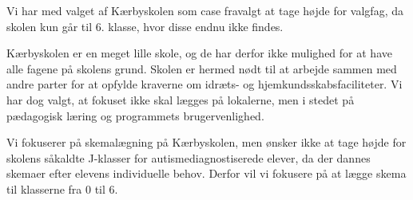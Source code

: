 Vi har med valget af Kærbyskolen som case fravalgt at tage højde for valgfag, da skolen kun går til 6. klasse, hvor disse endnu ikke findes. 

Kærbyskolen er en meget lille skole, og de har derfor ikke mulighed for at have alle fagene på skolens grund. Skolen er hermed nødt til at arbejde sammen med andre parter for at opfylde kraverne om idræts- og hjemkundsskabsfaciliteter. Vi har dog valgt, at fokuset ikke skal lægges på lokalerne, men i stedet på pædagogisk læring og programmets brugervenlighed.

Vi fokuserer på skemalægning på Kærbyskolen, men ønsker ikke at tage højde for skolens såkaldte J-klasser for autismediagnostiserede elever, da der dannes skemaer efter elevens individuelle behov. Derfor vil vi fokusere på at lægge skema til klasserne fra 0 til 6.


